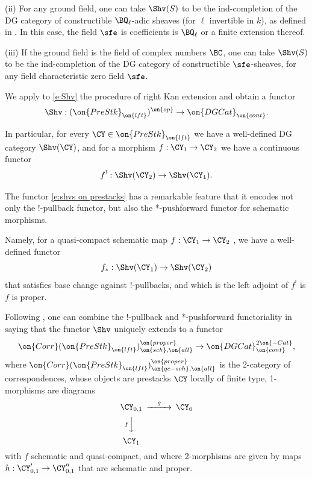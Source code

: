\documentclass[9pt]{amsart}
\theoremstyle{definition}
\theoremstyle{remark}
\numberwithin{equation}{section}
\begin{document}
\smallskip

\noindent(ii) For any ground field, one can take $\Shv(S)$ to be the ind-completion of the DG category of constructible
$\BQ_\ell$-adic sheaves (for $\ell$ invertible in $k$), as defined in \cite[Sect. 2.3.2]{GL}. In this case, the field $\sfe$ is 
coefficients is $\BQ_\ell$ or a finite extension thereof. 

\smallskip

\noindent(iii) If the ground field is the field of complex numbers $\BC$, one can take $\Shv(S)$ to be the ind-completion 
of the DG category of constructible $\sfe$-sheaves, for any field characteristic zero field $\sfe$. 

\sssec{}

We apply to \eqref{e:Shv} the procedure of right Kan extension and obtain a functor
\begin{equation}  \label{e:shvs on prestacks}
\Shv:(\on{PreStk}_{\on{lft}})^{\on{op}}\to \on{DGCat}_{\on{cont}}.
\end{equation}

In particular, for every $\CY\in \on{PreStk}_{\on{lft}}$ we have a well-defined DG category
$\Shv(\CY)$, and for a morphism $f:\CY_1\to \CY_2$ we have a continuous functor
$$f^!:\Shv(\CY_2)\to \Shv(\CY_1).$$

\sssec{}

The functor \eqref{e:shvs on prestacks} has a remarkable feature that it encodes not only
the !-pullback functor, but also the *-pushforward functor for schematic morphisms. 

\medskip

Namely, for a quasi-compact schematic map $f:\CY_1\to \CY_2$ , we have a well-defined functor
$$f_*:\Shv(\CY_1)\to \Shv(\CY_2)$$ 
that satisfies base change against !-pullbacks, and which is the left adjoint of $f^!$ is $f$ is proper. 

\medskip

Following \cite[Chapter 7]{GR1}, one can combine the !-pullback and *-pushforward functoriality in saying that the functor 
$\Shv$ uniquely extends to a functor
\begin{equation}  \label{e:Shv corr}
\on{Corr}(\on{PreStk}_{\on{lft}})^{\on{proper}}_{\on{sch},\on{all}}\to \on{DGCat}^{2\on{-Cat}}_{\on{cont}},
\end{equation}
where $\on{Corr}(\on{PreStk}_{\on{lft}})^{\on{proper}}_{\on{qc-sch},\on{all}}$ is the 2-category of correspondences,
whose objects are prestacks $\CY$ locally of finite type, 1-morphisms are diagrams
$$
\CD
\CY_{0,1} @>{g}>>  \CY_0 \\
@V{f}VV  \\
\CY_1
\endCD
$$
with $f$ schematic and quasi-compact, and where 2-morphisms are given by maps $h:\CY'_{0,1} \to \CY''_{0,1}$
that are schematic and proper. 
\end{document}
